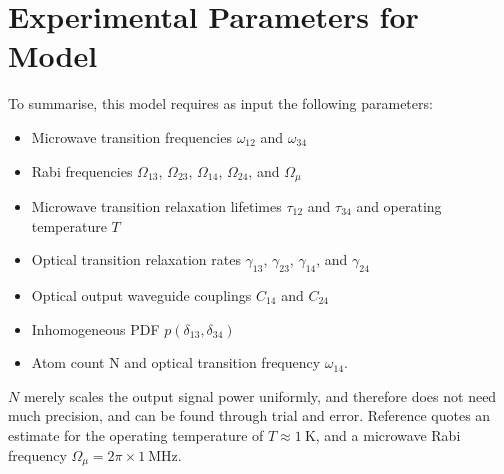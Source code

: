 \section{\label{sec:4lt_parameters}Experimental Parameters for Model}
To summarise, this model requires as input the following parameters:
\begin{itemize}
    \item Microwave transition frequencies $\omega_{12}$ and $\omega_{34}$
    \item Rabi frequencies $\Omega_{13}$, $\Omega_{23}$, $\Omega_{14}$, $\Omega_{24}$, and $\Omega_\mu$
    \item Microwave transition relaxation lifetimes $\tau_{12}$ and $\tau_{34}$ and operating temperature $T$
    \item Optical transition relaxation rates $\gamma_{13}$, $\gamma_{23}$, $\gamma_{14}$, and $\gamma_{24}$
    \item Optical output waveguide couplings $C_{14}$ and $C_{24}$
    \item Inhomogeneous PDF $p(\delta_{13}, \delta_{34})$
    \item Atom count N and optical transition frequency $\omega_{14}$.
\end{itemize}
$N$ merely scales the output signal power uniformly, and therefore does not need much precision, and can be found through trial and error. Reference \cite{bartholomew_chip_2020} quotes an estimate for the operating temperature of $T \approx \qty{1}{\kelvin}$, and a microwave Rabi frequency $\Omega_\mu = 2\pi \times \qty{1}{\mega\hertz}$.

